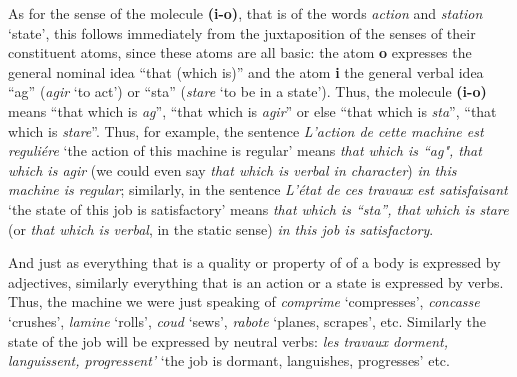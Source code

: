 \begin{sloppypar}
{    As for the sense of the molecule \textbf{(i-o)}, that is of the
    words \emph{action} and \emph{station} `state', this follows
    immediately from the juxtaposition of the senses of their
    constituent atoms, since these atoms are all basic: the atom
    \textbf{o} expresses the general nominal idea ``that (which is)''
    and the atom \textbf{i} the general verbal idea ``ag''
    (\emph{agir} `to act') or ``sta'' (\emph{stare} `to be in a
    state').  Thus, the molecule \textbf{(i-o)} means ``that which is
    \emph{ag}'', ``that which is \emph{agir}'' or else ``that which is
    \emph{sta}'', ``that which is \emph{stare}''.  Thus, for example,
    the sentence \emph{L'action de cette machine est reguliére} `the
    action of this machine is regular' means \emph{that which is
      ``ag", that which is \emph{agir}} (we could even say \emph{that
      which is verbal in character}) \emph{in this machine is
      regular}; similarly, in the sentence \emph{L'état de ces travaux
      est satisfaisant} `the state of this job is satisfactory' means
    \emph{that which is ``sta'', that which is \emph{stare}} (or
    \emph{that which is verbal}, in the static sense) \emph{in this
      job is satisfactory}.

    And just as everything that is a quality or property of of a body
    is expressed by adjectives, similarly everything that is an action
    or a state is expressed by verbs. Thus, the machine we were just
    speaking of \emph{comprime} `compresses', \emph{concasse}
    `crushes', \emph{lamine} `rolls', \emph{coud} `sews',
    \emph{rabote} `planes, scrapes', etc. Similarly the state of the
    job will be expressed by neutral verbs: \emph{les travaux dorment,
      languissent, progressent'} `the job is dormant, languishes,
    progresses' etc.  }

\end{sloppypar}
